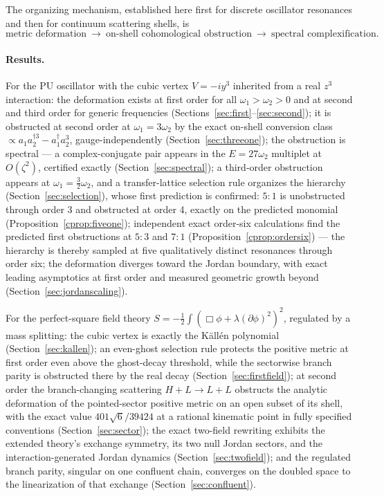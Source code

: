 \documentclass[11pt]{article}
\theoremstyle{definition}
\theoremstyle{remark}
\newcommand{\w}{\omega}
\newcommand{\dg}{\dagger}
\begin{document}
The organizing mechanism, established here first for discrete
oscillator resonances and then for continuum scattering shells, is
\begin{equation*}
\text{metric deformation}
\ \longrightarrow\
\text{on-shell cohomological obstruction}
\ \longrightarrow\
\text{spectral complexification}.
\end{equation*}

\paragraph{Results.}
For the PU oscillator with the cubic vertex $V=-iy^3$ inherited from a
real $z^3$ interaction: the deformation exists at first order for all
$\w_1>\w_2>0$ and at second and third order for generic frequencies
(Sections~\ref{sec:first}--\ref{sec:second}); it is obstructed at
second order at $\w_1=3\w_2$ by the exact on-shell conversion class
$\propto a_1a_2^{\dg3}-a_1^{\dg}a_2^3$, gauge-independently
(Section~\ref{sec:threeone}); the obstruction is spectral --- a
complex-conjugate pair appears in the $E=27\w_2$ multiplet at
$O(\zeta^2)$, certified exactly (Section~\ref{sec:spectral}); a
third-order obstruction appears at $\w_1=\tfrac32\w_2$, and a
transfer-lattice selection rule organizes the hierarchy
(Section~\ref{sec:selection}), whose first prediction is confirmed:
$5{:}1$ is unobstructed through order 3 and obstructed at order 4,
exactly on the predicted monomial
(Proposition~\ref{cprop:fiveone}); independent exact order-six calculations
find the predicted first obstructions at $5{:}3$ and $7{:}1$
(Proposition~\ref{cprop:ordersix}) --- the hierarchy is thereby sampled at
five qualitatively distinct resonances through order six; the deformation
diverges toward the
Jordan boundary, with exact leading asymptotics at first order and
measured geometric growth beyond (Section~\ref{sec:jordanscaling}).

For the perfect-square field theory
$S=-\tfrac12\int(\Box\phi+\lambda(\partial\phi)^2)^2$, regulated by a
mass splitting: the cubic vertex is exactly the K\"all\'en polynomial
(Section~\ref{sec:kallen}); an even-ghost selection rule protects the
positive metric at first order even above the ghost-decay threshold,
while the sectorwise branch parity is obstructed there by the real
decay (Section~\ref{sec:firstfield}); at second order the
branch-changing scattering $H+L\to L+L$ obstructs the analytic
deformation of the pointed-sector positive metric on an open subset of
its shell, with the exact value $401\sqrt6/39424$ at a rational
kinematic point in fully specified conventions
(Section~\ref{sec:sector}); the exact two-field rewriting exhibits the
extended theory's exchange symmetry, its two null Jordan sectors, and
the interaction-generated Jordan dynamics (Section~\ref{sec:twofield});
and the regulated branch parity, singular on one confluent chain,
converges on the doubled space to the linearization of that exchange
(Section~\ref{sec:confluent}).
\end{document}
